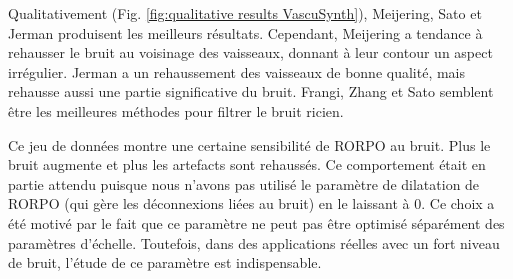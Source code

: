Qualitativement (Fig. \ref{fig:qualitative results VascuSynth}), Meijering, Sato et Jerman produisent les meilleurs résultats. Cependant, Meijering a tendance à rehausser le bruit au voisinage des vaisseaux, donnant à leur contour un aspect irrégulier. Jerman a un rehaussement des vaisseaux de bonne qualité, mais rehausse aussi une partie significative du bruit. Frangi, Zhang et Sato semblent être les meilleures méthodes pour filtrer le bruit ricien. 

Ce jeu de données montre une certaine sensibilité de RORPO au bruit. Plus le bruit augmente et plus les artefacts sont rehaussés. Ce comportement était en partie attendu puisque nous n'avons pas utilisé le paramètre de dilatation de RORPO (qui gère les déconnexions liées au bruit) en le laissant à 0. Ce choix a été motivé par le fait que ce paramètre ne peut pas être optimisé séparément des paramètres d'échelle. Toutefois, dans des applications réelles avec un fort niveau de bruit, l'étude de ce paramètre est indispensable. 

